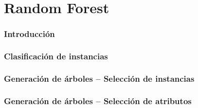 \section{Random Forest}
\begin{frame}
  \frametitle{Introducción}
\end{frame}

\begin{frame}
  \frametitle{Clasificación de instancias}
\end{frame}


\begin{frame}
  \frametitle{Generación de árboles -- Selección de instancias}
\end{frame}

\begin{frame}
  \frametitle{Generación de árboles -- Selección de atributos}
\end{frame}

